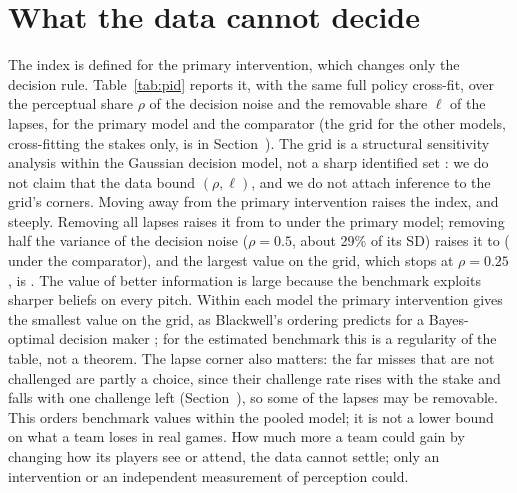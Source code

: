 \documentclass[aoas]{imsart}
\theoremstyle{plain}
\theoremstyle{definition}
\begin{document}
\section{What the data cannot decide}\label{sec:pid}

The index is defined for the primary intervention, which changes only the decision rule. Table~\ref{tab:pid} reports
it, with the same full policy cross-fit, over the perceptual share $\rho$ of the decision noise and the removable share
$\ell$ of the lapses, for the primary model and the comparator (the grid for the other models, cross-fitting the stakes
only, is in Section~). The grid is a structural sensitivity analysis within the Gaussian decision
model, not a sharp identified set \citep{Manski2003}: we do not claim that the data bound $(\rho,\ell)$, and we do not
attach inference to the grid's corners. Moving away from the primary intervention raises the index, and steeply.
Removing all lapses raises it from \Gap{} to \GapLamOne{} under the primary model; removing half the variance of the decision noise ($\rho=0.5$, about 29\% of its SD) raises it to \GapRhoHalf{} (\GapMainRhoHalf{} under the comparator), and the largest value on the grid,
which stops at $\rho=0.25$, is \GapGridHi. The value of better information is large because the benchmark exploits
sharper beliefs on every pitch. Within each model the primary intervention gives the smallest value on the grid, as Blackwell's ordering predicts
for a Bayes-optimal decision maker \citep{Blackwell1953}; for the estimated benchmark this is a regularity of the table,
not a theorem. The lapse corner also matters: the far misses that are not challenged are partly a
choice, since their challenge rate rises with the stake and falls with one challenge left (Section~),
so some of the lapses may be removable. This orders benchmark values within the pooled
model; it is not a lower bound on what a team loses in real games. How much more a team could gain by changing how its players see or attend, the data cannot settle; only an intervention or an independent measurement of perception could.

\begin{table}[t]
\caption{The accounting index, wins per team-season, full policy cross-fit ($S=\GapS$ splits), by intervention: $\rho$
is the perceptual share of the decision noise (1: all of it stays), $\ell$ the share of lapses a rule change removes
(primary model). Primary intervention: $\rho=1$, $\ell=0$. A sensitivity grid, not a confidence set.}\label{tab:pid}
\centering\small

\end{table}
\end{document}
